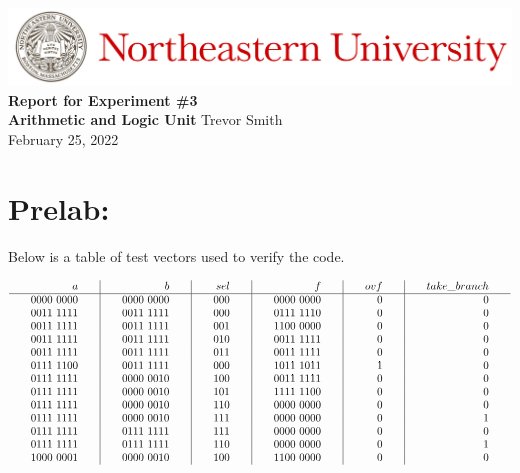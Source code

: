 \documentclass[12pt,a4paper]{article}
\begin{document}
\begin{center}
    \includegraphics[width=\textwidth]{./Images/Header.jpeg}
    \vfill
    \textbf{\Large{Report for Experiment \#3\\
    Arithmetic and Logic Unit}}
    \vfill
    Trevor Smith\\
    February 25, 2022
    \vfill
\end{center}

\newpage

\section*{Prelab:}

Below is a table of test vectors used to verify the code.

$\setlength{\arraycolsep}{20pt}
\begin{array}[R]{r|r|r|r|r|r}
	a & b & sel & f & ovf & take\_branch \\ \hline
	0000\ 0000 & 0000\ 0000 & 000 & 0000\ 0000 & 0 & 0 \\
	0011\ 1111 & 0011\ 1111 & 000 & 0111\ 1110 & 0 & 0 \\
	0011\ 1111 & 0011\ 1111 & 001 & 1100\ 0000 & 0 & 0 \\
	0011\ 1111 & 0011\ 1111 & 010 & 0011\ 1111 & 0 & 0 \\
	0011\ 1111 & 0011\ 1111 & 011 & 0011\ 1111 & 0 & 0 \\
	0111\ 1100 & 0011\ 1111 & 000 & 1011\ 1011 & 1 & 0 \\
	0111\ 1111 & 0000\ 0010 & 100 & 0011\ 1111 & 0 & 0 \\
	0111\ 1111 & 0000\ 0010 & 101 & 1111\ 1100 & 0 & 0 \\
	0111\ 1111 & 0000\ 0010 & 110 & 0000\ 0000 & 0 & 0 \\
	0111\ 1111 & 0000\ 0010 & 111 & 0000\ 0000 & 0 & 1 \\
	0111\ 1111 & 0111\ 1111 & 111 & 0000\ 0000 & 0 & 0 \\
	0111\ 1111 & 0111\ 1111 & 110 & 0000\ 0000 & 0 & 1 \\
	1000\ 0001 & 0000\ 0010 & 100 & 1100\ 0000 & 0 & 0 \\
\end{array}$ \\ \\
\end{document}
